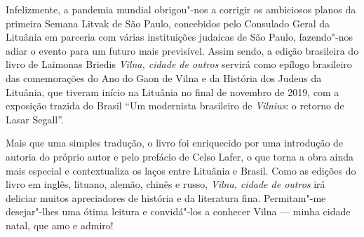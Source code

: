 Infelizmente, a pandemia mundial obrigou"-nos a corrigir os ambiciosos
planos da primeira Semana Litvak de São Paulo, concebidos pelo Consulado
Geral da Lituânia em parceria com várias instituições judaicas de São
Paulo, fazendo"-nos adiar o evento para um futuro mais previsível. Assim
sendo, a edição brasileira do livro de Laimonas Briedis \textit{Vilna, cidade
de outros} servirá como epílogo brasileiro das comemorações do
Ano do Gaon de Vilna e da História dos Judeus da Lituânia, que
tiveram início na Lituânia no final de novembro de 2019, com a exposição
trazida do Brasil ``Um modernista brasileiro de \textit{Vilnius}: o retorno de
Lasar Segall''.

Mais que uma simples tradução, o livro foi enriquecido por uma
introdução de autoria do próprio autor e pelo prefácio de Celso Lafer, o
que torna a obra ainda mais especial e contextualiza os laços entre
Lituânia e Brasil. Como as edições do livro em inglês, lituano, alemão,
chinês e russo, \textit{Vilna, cidade de outros} irá deliciar muitos
apreciadores de história e da literatura fina. Permitam"-me desejar"-lhes
uma ótima leitura e convidá"-los a conhecer Vilna --- minha cidade natal,
que amo e admiro!

